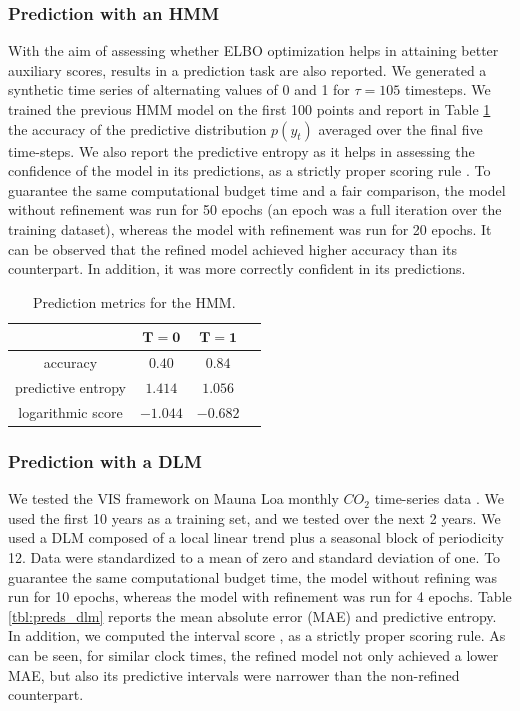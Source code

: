 \subsubsection{Prediction with an HMM} 
With the aim of assessing whether ELBO optimization helps in attaining better auxiliary scores, results in a prediction task are also reported. We generated a synthetic time series of alternating values of 0 and 1 for $\tau=105$ timesteps. We trained the previous HMM model on the first 100 points and report in Table \ref{tbl:preds} the accuracy of the predictive distribution $p(y_t)$ averaged over the final five time-steps. We also report the predictive entropy as it helps in assessing the confidence of the model in its predictions, as a strictly proper scoring rule \cite{gneiting2007strictly}. To guarantee the same computational budget time and a fair comparison, the model without refinement was run for 50 epochs (an epoch was a full iteration over the training dataset), whereas the model with refinement was run for 20 epochs. It can be observed that the refined model achieved higher accuracy than its counterpart. In addition,
it was more correctly confident in its predictions.
\begin{table}[H]

\caption{Prediction metrics for the HMM.}\label{tbl:preds}
\begin{tabular}{c@{\hskip 1.2in}c@{\hskip 1.1in}c@{\hskip 1in}c}
\toprule
   & $\bm{T=0}$                             & $\bm{T=1}$   \\ 
 \midrule
    accuracy          & $0.40$ &  $0.84$ \\
    predictive entropy          & $1.414$ &  $1.056$ \\
    logarithmic score   & $-1.044$ & $-0.682$ \\
 \bottomrule
\end{tabular}
\end{table}

\subsubsection{Prediction with a DLM}

We tested the VIS framework on Mauna Loa monthly $CO_2$ time-series data \cite{keeling2005atmospheric}. We used the first 10 years as a training set, and we tested over the next 2 years. We used a DLM composed of a local linear trend plus a seasonal block of periodicity 12. %
Data were standardized %
to {a mean of zero and standard deviation of one}. To guarantee the same computational budget time, the model without refining was run for 10 epochs, whereas the model with refinement was run for 4 epochs.  Table \ref{tbl:preds_dlm}
reports the mean absolute error (MAE) and predictive entropy. 
In addition, we computed the interval score 
 \cite{gneiting2007strictly}, as a strictly proper scoring rule. As can be seen, for similar clock times, the refined model not only achieved a lower MAE, but also its predictive intervals were narrower than the non-refined counterpart. 

